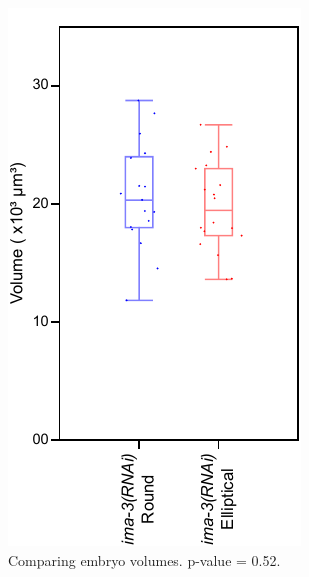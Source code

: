\begin{figure}
\hfill
\begin{subfigure}[t]{0.3\textwidth}
    \centering
    \includegraphics[width=\textwidth]{Results/FigIma3RoundElliptical/vol.pdf}
    \caption{Comparing embryo volumes. p-value = \num{0.52}.} 
    \label{subfig:ima3CompareRoundElliptical-volume}
\end{subfigure}
\hfill
\begin{subfigure}[t]{0.3\textwidth}
    \centering

\end{subfigure}
\end{figure}
